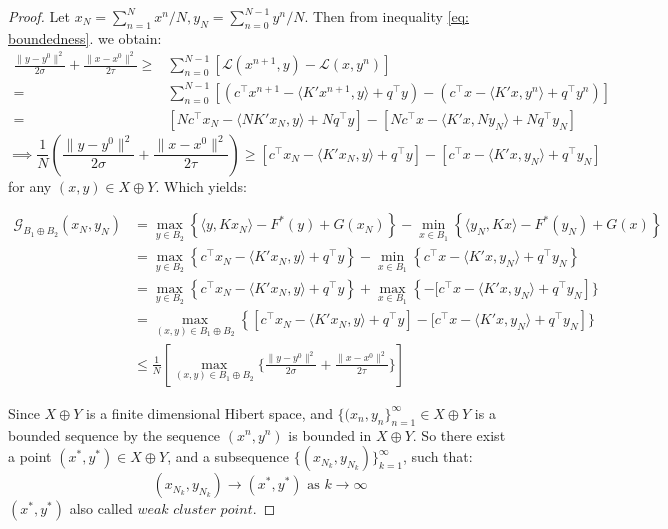 \documentclass[10pt,a4paper]{amsart}
\begin{document}
\begin{proof}
Let \(x_N = \sum_{n=1}^{N}{x^n}/N, y_N = \sum_{n=0}^{N-1}{y^n}/N\). Then from inequality \eqref{eq: boundedness}. we obtain:
\[
\begin{aligned}
    \frac{\|y - y^{0}\|^2}{2\sigma} + \frac{\|x - x^0\|^2}{2\tau} \ge &\sum_{n=0}^{N-1} \left[\mathcal{L}(x^{n+1},y)- \mathcal{L}(x,y^n) \right]\\
    =&\sum_{n=0}^{N-1} \left[ \left( c^\top x^{n+1} - \langle K'x^{n+1}, y \rangle + q^\top y \right) 
- \left( c^\top x - \langle K'x, y^n \rangle + q^\top y^n \right) \right]\\
=& [Nc^\top x_N - \langle NK'x_N, y \rangle + Nq^\top y] - [N c^\top x - \langle K'x, Ny_N \rangle + Nq^\top y_N ]
\end{aligned}
\]
\begin{equation}
\label{eq:bounded_xNyN}
\implies \frac{1}{N}(\frac{\|y - y^{0}\|^2}{2\sigma} + \frac{\|x - x^0\|^2}{2\tau}) \ge  [c^\top x_N - \langle K'x_N, y \rangle + q^\top y] - [c^\top x - \langle K'x, y_N \rangle + q^\top y_N ]
\end{equation}
for any \((x,y) \in X \oplus Y\). Which yields:

\[
\begin{aligned}
\mathcal{G}_{B_1 \oplus B_2}(x_N,y_N) &= \max_{y \in B_2}\left\{ \langle y,Kx_N \rangle - F^*(y)+G(x_N)\right\} - \min_{x \in B_1}\left\{ \langle y_N,Kx \rangle - F^*(y_N)+G(x)\right\} \\
&= \max_{y \in B_2}\left\{ c^\top x_N - \langle K'x_N, y \rangle + q^\top y\right\} - \min_{x \in B_1}\left\{ c^\top x - \langle K'x, y_N \rangle + q^\top y_N\right\}\\
&=\max_{y \in B_2}\left\{ c^\top x_N - \langle K'x_N, y \rangle + q^\top y\right\} + \max_{x \in B_1}\left\{-[ c^\top x - \langle K'x, y_N \rangle + q^\top y_N\right]\}\\
&=\max_{(x,y) \in B_1\oplus B_2}\left\{ [c^\top x_N - \langle K'x_N, y \rangle + q^\top y] -[ c^\top x - \langle K'x, y_N \rangle + q^\top y_N\right]\}\\
&\le \frac{1}{N}[\max_{(x,y) \in B_1\oplus B_2}\{\frac{\|y - y^{0}\|^2}{2\sigma} + \frac{\|x - x^0\|^2}{2\tau}\}]
\end{aligned}
\]

Since \(X \oplus Y\) is a finite dimensional Hibert space, and \(\{(x_n,y_n\}_{n=1}^{\infty} \in X \oplus Y\) is a bounded sequence by the sequence \((x^n,y^n)\) is bounded in \(X \oplus Y\). So there exist a point \((x^*,y^*) \in X \oplus Y\), and a subsequence \(\{(x_{N_k},y_{N_k})\}_{k=1}^{\infty}\), such that: 
\[
(x_{N_k},y_{N_k}) \to (x^*,y^*) \text{ as }k\to \infty 
\]
\((x^*,y^*)\) also called \(\textit{weak cluster point}\).




\end{proof}
\end{document}
